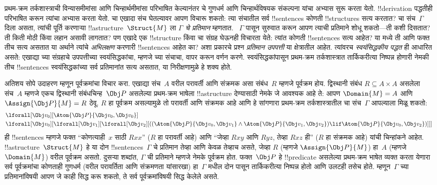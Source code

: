 \documentclass[../../../include/open-logic-section]{subfiles}
\begin{document}


प्रथम-क्रम तर्कशास्त्राची विन्यासमीमांसा आणि चिन्हार्थमीमांसा परिभाषित
केल्यानंतर चे गुणधर्म आणि चिन्हार्थविषयक संकल्पना यांचा
अभ्यास सुरू करता येतो. !!{derivation} पद्धतीही परिभाषित करून त्यांचा
अभ्यास करता येतो. चा एखादा संच घेतल्यावर आपण विचारू
शकतो: त्या संचातील सर्व !!{sentence}s कोणती !!{structure}s सत्य करतात?
चा संच~$\Gamma$ दिला असता, त्यांची पूर्ति करणाऱ्या
!!a{structure}~$\Struct{M}$ ला \emph{$\Gamma$ चे प्रतिमान} म्हणतात.
~$\Gamma$ पासून सुरुवात करून आपण त्याची प्रतिमाने शोधू शकतो---ती कशी
दिसतात? ती किती मोठी किंवा लहान असावी लागतात? पण एखादे एक
!!{structure} किंवा चा संग्रह घेऊनही विचारता येते: त्यांत
कोणती !!{sentence}s सत्य आहेत? या मध्ये ती आणि फक्त तीच
सत्य असतात या अर्थाने त्यांचे \emph{अभिलक्षण} करणारी !!{sentence}s आहेत
का? अशा प्रकारचे प्रश्न \emph{प्रतिमान उपपत्ती} या क्षेत्रातील आहेत.
त्यांवरच \emph{स्वयंसिद्धकीय पद्धत} ही आधारित असते: एखाद्या
च्या संग्रहाचे उपपत्तीच्या स्वयंसिद्धकांचा, म्हणजे
च्या संचाचा, वापर करून वर्णन करणे. स्वयंसिद्धकांपासून
प्रथम-क्रम तर्कशास्त्रात तार्किकरीत्या निष्पन्न होणारी नेमकी तीच
!!{sentence}s स्वयंसिद्धकांच्या सर्व प्रतिमानांत सत्य असतात, या
निरीक्षणामुळे हे शक्य होते.

अतिशय सोपे उदाहरण म्हणून पूर्वक्रमांचा विचार करा. एखाद्या संच~$A$ वरील
परावर्ती आणि संक्रमक असा संबंध~$R$ म्हणजे पूर्वक्रम होय. द्विस्थानी
संबंध $R \subseteq A \times A$ असलेला संच~$A$ म्हणजे एकच द्विस्थानी
संबंधचिन्ह~$\Obj P$ असलेल्या प्रथम-क्रम भाषेला !!a{structure} देण्यासाठी
नेमके जे आवश्यक आहे ते: आपण $\Domain{M} = A$ आणि
$\Assign{\Obj P}{M} = R$ ठेवू. $R$ हा पूर्वक्रम असल्यामुळे तो परावर्ती
आणि संक्रमक आहे आणि हे सांगणारा प्रथम-क्रम तर्कशास्त्रातील
चा संच~$\Gamma$ आपल्याला मिळू शकतो:
\begin{align*}
  & \lforall[\Obj v_0][\Atom{\Obj P}{\Obj v_0,\Obj v_0}]\\
  & \lforall[\Obj v_0][\lforall[\Obj v_1][\lforall[\Obj v_2][((\Atom{\Obj P}{\Obj v_0,\Obj v_1} \land \Atom{\Obj P}{\Obj v_1,\Obj v_2}) \lif \Atom{\Obj P}{\Obj v_0,\Obj v_2})]]]
\end{align*}
ही !!{sentence}s म्हणजे फक्त ``कोणत्याही~$x$ साठी $Rxx$'' ($R$ हा
परावर्ती आहे) आणि ``जेव्हा $Rxy$ आणि $Ryz$, तेव्हा $Rxz$ ही'' ($R$ हा
संक्रमक आहे) यांची चिन्हांकने आहेत. !!a{structure}~$\Struct{M}$ हे या
दोन !!{sentence}s~$\Gamma$ चे प्रतिमान तेव्हा आणि केवळ तेव्हाच असते,
जेव्हा $R$ (म्हणजे $\Assign{\Obj P}{M}$) हा~$A$ (म्हणजे
$\Domain{M}$) वरील पूर्वक्रम असतो. दुसऱ्या शब्दांत, $\Gamma$ ची प्रतिमाने
म्हणजे नेमके पूर्वक्रम होत. फक्त~$\Obj P$ हे !!{predicate} असलेल्या
प्रथम-क्रम भाषेत व्यक्त करता येणारा सर्व पूर्वक्रमांचा कोणताही गुणधर्म
(वरील परावर्तिता आणि संक्रमणता यांसारखा) हा~$\Gamma$ मधील दोन
पासून तार्किकरीत्या निष्पन्न होतो आणि उलटही तसेच होते.
म्हणून~$\Gamma$ च्या प्रतिमानांविषयी आपण जे काही सिद्ध करू शकतो, ते सर्व
पूर्वक्रमांविषयी सिद्ध केलेले असते.
\end{document}
